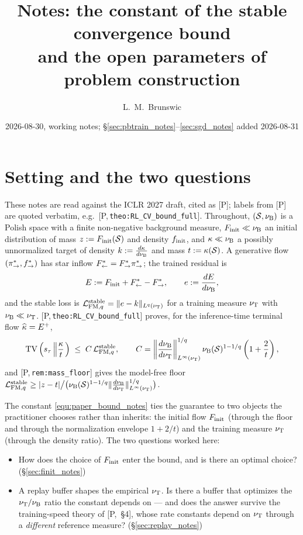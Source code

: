 \documentclass[11pt]{article}
\title{Notes: the constant of the stable convergence bound\\
and the open parameters of problem construction}
\author{L.~M.~Brunswic}
\date{2026-08-30, working notes; \S\ref{sec:pbtrain_notes}--\ref{sec:sgd_notes} added 2026-08-31}
\theoremstyle{definition}
\theoremstyle{remark}
\newcommand{\paperref}[1]{[P,\,\texttt{#1}]}   %
\begin{document}
\maketitle

\section{Setting and the two questions}\label{sec:setting_notes}

These notes are read against the ICLR 2027 draft, cited as [P]; labels from [P] are quoted
verbatim, e.g.\ \paperref{theo:RL\_CV\_bound\_full}. Throughout, $(\mathcal S,\nu_{\mathrm{B}})$ is a
Polish space with a finite non-negative background measure, $F_{\mathrm{init}}\ll\nu_{\mathrm{B}}$ an initial
distribution of mass $z:=F_{\mathrm{init}}(\mathcal S)$ and density $f_{\mathrm{init}}$, and
$\kappa\ll\nu_{\mathrm{B}}$ a possibly unnormalized target of density $k:=\frac{d\kappa}{d\nu_{\mathrm{B}}}$
and mass $t:=\kappa(\mathcal S)$. A generative flow $(\pi_{\rightarrow}^*,f^*_{\rightarrow})$ has
star inflow $F^*_{\leftarrow}=F^*_{\rightarrow}\pi_{\rightarrow}^*$; the trained residual is
\begin{equation*}
    E:=F_{\mathrm{init}}+F^*_{\leftarrow}-F^*_{\rightarrow},\qquad e:=\frac{dE}{d\nu_{\mathrm{B}}},
\end{equation*}
and the stable loss is $\mathcal L_{\mathrm{FM},q}^{\mathrm{stable}}=\|e-k\|_{L^q(\nu_{\mathrm{T}})}$ for a training measure
$\nu_{\mathrm{T}}$ with $\nu_{\mathrm{B}}\ll\nu_{\mathrm{T}}$. \paperref{theo:RL\_CV\_bound\_full} proves, for the
inference-time terminal flow $\widehat{\kappa}=E^+$,
\begin{equation}\label{equ:paper_bound_notes}
    \mathrm{TV}\left(s_\tau\left\|\frac{\kappa}{t}\right.\right)\;\leq\;C\,\mathcal L_{\mathrm{FM},q}^{\mathrm{stable}},\qquad
    C=\left\|\frac{d\nu_{\mathrm{B}}}{d\nu_{\mathrm{T}}}\right\|^{1/q}_{L^\infty(\nu_{\mathrm{T}})}\nu_{\mathrm{B}}(\mathcal S)^{1-1/q}
      \left(1+\frac{2}{t}\right),
\end{equation}
and \paperref{rem:mass\_floor} gives the model-free floor
$\mathcal L_{\mathrm{FM},q}^{\mathrm{stable}}\geq|z-t|\big/\bigl(\nu_{\mathrm{B}}(\mathcal S)^{1-1/q}\|\frac{d\nu_{\mathrm{B}}}{d\nu_{\mathrm{T}}}\|^{1/q}_{L^\infty(\nu_{\mathrm{T}})}\bigr)$.

The constant \eqref{equ:paper_bound_notes} ties the guarantee to two objects the practitioner
chooses rather than inherits: the initial flow $F_{\mathrm{init}}$ (through the floor and through the
normalization envelope $1+2/t$) and the training measure $\nu_{\mathrm{T}}$ (through the density
ratio). The two questions worked here:

\begin{itemize}
    \item[\textbf{Q1}] How does the choice of $F_{\mathrm{init}}$ enter the bound, and is there an
    optimal choice? (\S\ref{sec:finit_notes})
    \item[\textbf{Q2}] A replay buffer shapes the empirical $\nu_{\mathrm{T}}$. Is there a buffer
    that optimizes the $\nu_{\mathrm{T}}/\nu_{\mathrm{B}}$ ratio the constant depends on --- and does the
    answer survive the training-speed theory of [P,~\S4], whose rate constants depend on
    $\nu_{\mathrm{T}}$ through a \emph{different} reference measure? (\S\ref{sec:replay_notes})
\end{itemize}
\end{document}
